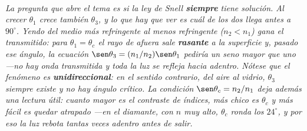 \begin{center}
\begin{tikzpicture}[scale=1]
\end{tikzpicture}\\[0.5em]
{\small\itshape La pregunta que abre el tema es si la ley de Snell
\textbf{siempre} tiene solución. Al crecer $\theta_1$ crece también $\theta_3$, y
lo que hay que ver es cuál de los dos llega antes a $90^\circ$. Yendo del medio
más refringente al menos refringente ($n_2 < n_1$) gana el transmitido: para
$\theta_1 = \theta_c$ el rayo de afuera sale \textbf{rasante} a la superficie y,
pasado ese ángulo, la ecuación $\sen\theta_3 = (n_1/n_2)\sen\theta_1$ pediría un
seno mayor que uno ---no hay onda transmitida y toda la luz se refleja hacia
adentro. Nótese que el fenómeno es \textbf{unidireccional}: en el sentido
contrario, del aire al vidrio, $\theta_3$ siempre existe y no hay ángulo crítico.
La condición $\sen\theta_c = n_2/n_1$ deja además una lectura útil: cuanto mayor
es el contraste de índices, más chico es $\theta_c$ y más fácil es quedar
atrapado ---en el diamante, con $n$ muy alto, $\theta_c$ ronda los $24^\circ$, y
por eso la luz rebota tantas veces adentro antes de salir.}
\end{center}
